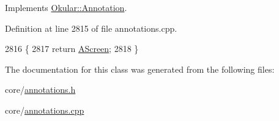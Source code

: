 Implements \hyperlink{classOkular_1_1Annotation_af9833449767eacd740f377e69a1fdd48}{Okular\+::\+Annotation}.



Definition at line 2815 of file annotations.\+cpp.


\begin{DoxyCode}
2816 \{
2817     \textcolor{keywordflow}{return} \hyperlink{classOkular_1_1Annotation_af71b46e37d5f850b97d5c4de3be9aac0a7cf8ba374ec139a8e2fb47a36182fa32}{AScreen};
2818 \}
\end{DoxyCode}


The documentation for this class was generated from the following files\+:\begin{DoxyCompactItemize}
\item 
core/\hyperlink{annotations_8h}{annotations.\+h}\item 
core/\hyperlink{annotations_8cpp}{annotations.\+cpp}\end{DoxyCompactItemize}
